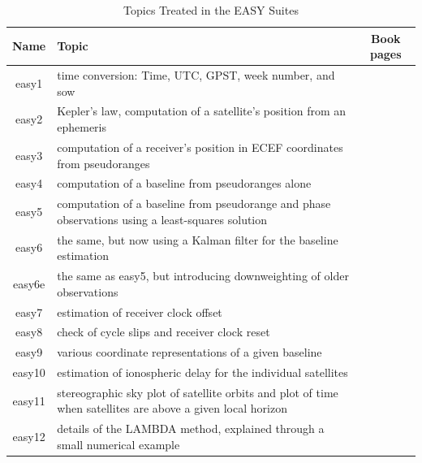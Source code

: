 \begin{table}
	\caption{Topics Treated in the EASY Suites}
	\footnotesize %
	\begin{tabularx}{\textwidth}{cXc}
		\hline  \rule[-2ex]{0pt}{5.5ex}   Name  & 					Topic 						  & Book pages\\ 
		\hline  \rule[-2ex]{0pt}{5.5ex}  easy1  & time conversion: Time, UTC, GPST, week number, and sow  		& \pageref{subsec:easy1} \\ 
		\rule[-2ex]{0pt}{5.5ex}  easy2  & Kepler’s law, computation of a satellite’s position from an ephemeris 			 & \pageref{subsec:easy2}  \\ 
		\rule[-2ex]{0pt}{5.5ex}  easy3  & computation of a receiver’s position in ECEF coordinates from pseudoranges 		 & \pageref{subsec:easy3}  \\ 
		\rule[-2ex]{0pt}{5.5ex}  easy4  & computation of a baseline from pseudoranges alone					   	    & \pageref{subsec:easy4}  \\ 
		\rule[-2ex]{0pt}{5.5ex}  easy5  & computation of a baseline from pseudorange and phase observations using a least-squares solution 	& \pageref{subsec:easy5}\\ 
		\rule[-2ex]{0pt}{5.5ex}  easy6  & the same, but now using a Kalman filter for the baseline estimation	  	   & \pageref{subsec:easy6}  \\ 
		\rule[-2ex]{0pt}{5.5ex}  easy6e & the same as easy5, but introducing downweighting of older observations 			   & \pageref{subsec:easy6e} \\
		\rule[-2ex]{0pt}{5.5ex}  easy7  & estimation of receiver clock offset							& \pageref{subsec:easy7}\\ 
		\rule[-2ex]{0pt}{5.5ex}  easy8  & check of cycle slips and receiver clock reset 						  & \pageref{subsec:easy8}   \\ 
		\rule[-2ex]{0pt}{5.5ex}  easy9  & various coordinate representations of a given baseline							& \pageref{subsec:easy9}   \\ 
		\rule[-2ex]{0pt}{5.5ex}  easy10 & estimation of ionospheric delay for the individual satellites		 		& \pageref{subsec:easy10}   \\ 
		\rule[-2ex]{0pt}{5.5ex}  easy11 & stereographic sky plot of satellite orbits and plot of time when satellites are above a given local horizon & \pageref{subsec:easy11}   \\ 
		\rule[-2ex]{0pt}{5.5ex}  easy12 & details of the LAMBDA method, explained through a small numerical example & \pageref{subsec:easy12}   \\ 

\end{tabularx}
\end{table}
